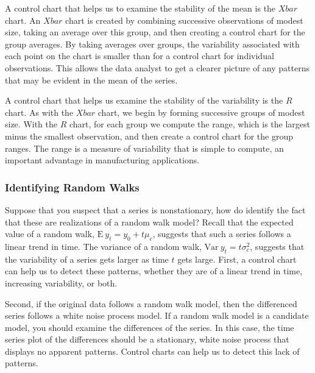 
A control chart that helps us to examine the stability of the mean
is the $Xbar$ chart. An $Xbar$ chart is created by combining
successive observations of modest size, taking an average over this
group, and then creating a control chart for the group averages. By
taking averages over groups, the variability associated with each
point on the chart is smaller than for a control chart for
individual observations. This allows the data analyst to get a
clearer picture of any patterns that may be evident in the mean of
the series.


A control chart that helps us examine the stability of the variability is
the $R$ chart. As with the $Xbar$ chart, we begin by forming successive
groups of modest size. With the $R$ chart, for each group we compute the
range, which is the largest minus the smallest observation, and then create
a control chart for the group ranges. The range is a measure of variability
that is simple to compute, an important advantage in manufacturing
applications.

\subsubsection*{Identifying Random Walks}

Suppose that you suspect that a series is nonstationary, how do
identify the fact that these are realizations of a random walk
model? Recall that the expected value of a random walk,
$\mathrm{E~}y_t=y_0+t\mu_c$, suggests that such a series follows a
linear trend in time. The variance of a random walk,
$\mathrm{Var~}y_t=t\sigma_c^2$, suggests that the variability of a
series gets larger as time $t$ gets large. First, a control chart
can help us to detect these patterns, whether they are of a linear
trend in time, increasing variability, or both.


Second, if the original data follows a random walk model, then the
differenced series follows a white noise process model. If a random walk
model is a candidate model, you should examine the differences of the
series. In this case, the time series plot of the differences should be a
stationary, white noise process that displays no apparent patterns. Control
charts can help us to detect this lack of patterns.

